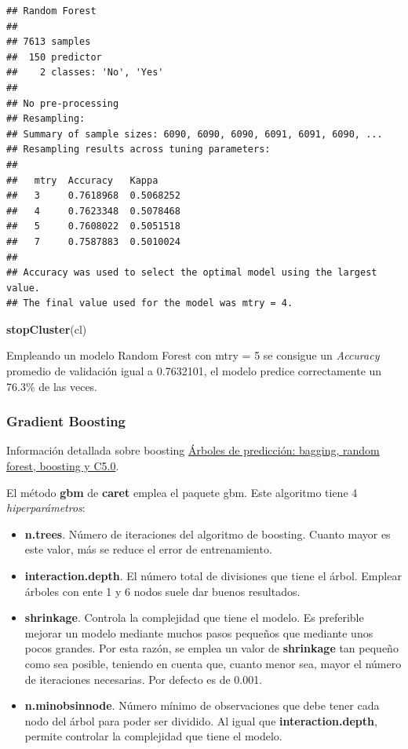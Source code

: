 \documentclass[]{article}
\newenvironment{Shaded}{\begin{snugshade}}{\end{snugshade}}
\newcommand{\KeywordTok}[1]{\textcolor[rgb]{0.13,0.29,0.53}{\textbf{#1}}}
\newcommand{\NormalTok}[1]{#1}
\begin{document}
\begin{verbatim}
## Random Forest 
## 
## 7613 samples
##  150 predictor
##    2 classes: 'No', 'Yes' 
## 
## No pre-processing
## Resampling: 
## Summary of sample sizes: 6090, 6090, 6090, 6091, 6091, 6090, ... 
## Resampling results across tuning parameters:
## 
##   mtry  Accuracy   Kappa    
##   3     0.7618968  0.5068252
##   4     0.7623348  0.5078468
##   5     0.7608022  0.5051518
##   7     0.7587883  0.5010024
## 
## Accuracy was used to select the optimal model using the largest value.
## The final value used for the model was mtry = 4.
\end{verbatim}

\begin{Shaded}
\begin{Highlighting}[]
\KeywordTok{stopCluster}\NormalTok{(cl)}
\end{Highlighting}
\end{Shaded}

Empleando un modelo Random Forest con mtry = 5 se consigue un
\emph{Accuracy} promedio de validación igual a 0.7632101, el modelo
predice correctamente un 76.3\% de las veces.

\hypertarget{gradient-boosting}{%
\subsubsection{Gradient Boosting}\label{gradient-boosting}}

Información detallada sobre boosting
\href{https://www.cienciadedatos.net/documentos/33_arboles_de_prediccion_bagging_random_forest_boosting}{Árboles
de predicción: bagging, random forest, boosting y C5.0}.

El método \textbf{gbm} de \textbf{caret} emplea el paquete gbm. Este
algoritmo tiene 4 \emph{hiperparámetros}:

\begin{itemize}
\item
  \textbf{n.trees}. Número de iteraciones del algoritmo de boosting.
  Cuanto mayor es este valor, más se reduce el error de entrenamiento.
\item
  \textbf{interaction.depth}. El número total de divisiones que tiene el
  árbol. Emplear árboles con ente 1 y 6 nodos suele dar buenos
  resultados.
\item
  \textbf{shrinkage}. Controla la complejidad que tiene el modelo. Es
  preferible mejorar un modelo mediante muchos pasos pequeños que
  mediante unos pocos grandes. Por esta razón, se emplea un valor de
  \textbf{shrinkage} tan pequeño como sea posible, teniendo en cuenta
  que, cuanto menor sea, mayor el número de iteraciones necesarias. Por
  defecto es de 0.001.
\item
  \textbf{n.minobsinnode}. Número mínimo de observaciones que debe tener
  cada nodo del árbol para poder ser dividido. Al igual que
  \textbf{interaction.depth}, permite controlar la complejidad que tiene
  el modelo.
\end{itemize}
\end{document}
